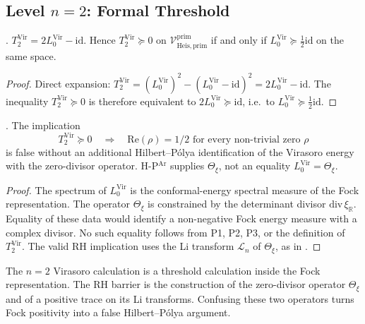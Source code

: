 \subsection{Level \(n=2\): Formal Threshold}
\label{v4-arith:vb:n=2}

\begin{theorem}[\(n=2\) Virasoro threshold]
\label{v4-arith:vb:thm:n=2}
\ClaimStatusProvedHere. \(T_{2}^{\mathrm{Vir}}=2L_{0}^{\mathrm{Vir}}-\mathrm{id}\).
Hence \(T_{2}^{\mathrm{Vir}}\succeq 0\) on
\(\mathcal{V}^{\mathrm{prim}}_{\mathrm{Heis},\mathrm{prim}}\) if and
only if \(L_{0}^{\mathrm{Vir}}\succeq\tfrac{1}{2}\mathrm{id}\) on the
same space.
\end{theorem}

\begin{proof}
Direct expansion:
\(T_{2}^{\mathrm{Vir}}=(L_{0}^{\mathrm{Vir}})^{2}-(L_{0}^{\mathrm{Vir}}-\mathrm{id})^{2}
=2L_{0}^{\mathrm{Vir}}-\mathrm{id}\). The inequality
\(T_{2}^{\mathrm{Vir}}\succeq 0\) is therefore equivalent to
\(2L_{0}^{\mathrm{Vir}}\succeq\mathrm{id}\), i.e.~to
\(L_{0}^{\mathrm{Vir}}\succeq\tfrac{1}{2}\mathrm{id}\).
\end{proof}

\begin{corollary}[\(n=2\) is not a zero-placement theorem]
\label{v4-arith:vb:cor:n=2-is-RH}
\ClaimStatusProvedHere. The implication
\[
T_{2}^{\mathrm{Vir}}\succeq0\quad\Longrightarrow\quad
\mathrm{Re}(\rho)=1/2\text{ for every non-trivial zero }\rho
\]
is false without an additional Hilbert--P\'olya identification of the
Virasoro energy with the zero-divisor operator. H-P\(^{\mathrm{Ar}}\) supplies
\(\Theta_{\xi}\), not an equality
\(L_{0}^{\mathrm{Vir}}=\Theta_{\xi}\).
\end{corollary}

\begin{proof}
The spectrum of \(L_{0}^{\mathrm{Vir}}\) is the conformal-energy
spectral measure of the Fock representation. The operator
\(\Theta_{\xi}\) is constrained by the determinant divisor
\(\mathrm{div}\,\xi_{\mathbb R}\). Equality of these data would
identify a non-negative Fock energy measure with a complex divisor. No
such equality follows from P1, P2, P3, or the definition of
\(T_{2}^{\mathrm{Vir}}\). The valid RH implication uses
the Li transform \(\mathcal L_{n}\) of \(\Theta_{\xi}\), as in
.
\end{proof}

\begin{remark}
\label{v4-arith:vb:rem:n=2-is-barrier}
The \(n=2\) Virasoro calculation is a threshold calculation inside
the Fock representation. The RH barrier is the construction of the
zero-divisor operator \(\Theta_{\xi}\) and of a positive trace on its Li
transforms. Confusing these two operators turns Fock positivity into
a false Hilbert--P\'olya argument.
\end{remark}


